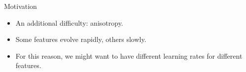 \documentclass[handout,xcolor=pdftex,dvipsnames,table,mathserif]{beamer}
\begin{document}


\begin{frame}{Motivation}
\begin{itemize}
	\item An additional difficulty: anisotropy.
	\item Some features evolve rapidly, others slowly. 
	\item For this reason, we might want to have different learning rates for different features.
\end{itemize}
\end{frame}

\end{document}
